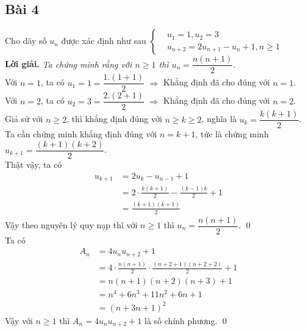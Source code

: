 \documentclass[a4paper,14pt]{article}
\begin{document}
    \subsection{Bài 4}
        Cho dãy số $u_n$ được xác định như sau  \(
                                                    \left\{
                                                            \begin{aligned}
                                                                &u_1=1, u_2=3
                                                                \\&u_{n+2}=2u_{n+1}-u_n+1, n\geqslant 1
                                                            \end{aligned}
                                                    \right.
                                                \)
        \\\noindent\textbf{Lời giải.}
            \textit{Ta chứng minh rằng với $n\geqslant 1$ thì $u_n=\dfrac{n(n+1)}{2}$.} \\
            Với $n=1$, ta có $u_1=1=\dfrac{1.(1+1)}{2}$ $\Rightarrow$ Khẳng định đã cho đúng với $n=1$. \\
            Với $n=2$, ta có $u_2=3=\dfrac{2.(2+1)}{2}$ $\Rightarrow$ Khẳng định đã cho đúng với $n=2$. \\
            Giả sử với $n\geqslant 2$, thì khẳng định đúng với $n\geqslant k\geqslant 2$, nghĩa là $u_k=\dfrac{k(k+1)}{2}$. \\
            Ta cần chứng minh khẳng định đúng với $n=k+1$, tức là chứng minh $u_{k+1}=\dfrac{(k+1)(k+2)}{2}$. \\
            Thật vậy, ta có
                \begin{align*}
                    u_{k+1}&=2u_k-u_{n-1}+1
                    \\&=2\cdot\frac{k(k+1)}{2}-\frac{(k-1)k}{2}+1
                    \\&=\frac{(k+1)(k+1)}{2}
                \end{align*}
            Vậy theo nguyên lý quy nạp thì với $n\geqslant 1$ thì $u_n=\dfrac{n(n+1)}{2}$.
            \qed
            \\
            Ta có 
                \begin{align*}
                    A_n&=4u_nu_{n+2}+1
                    \\&=4\cdot\frac{n(n+1)}{2}\cdot\frac{(n+2+1)(n+2+2)}{2}+1
                    \\&=n(n+1)(n+2)(n+3)+1
                    \\&=n^4+6n^3+11n^2+6n+1
                    \\&=(n+3n+1)^2
                \end{align*}
            Vậy với $n\geqslant 1$ thì $A_n=4u_nu_{n+2}+1$ là số chính phương.
        \qed
\end{document}
